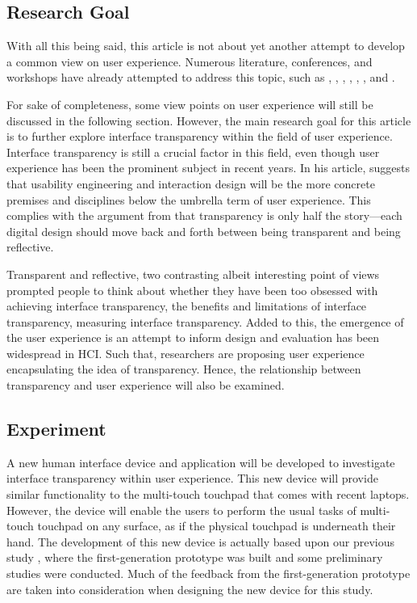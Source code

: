 \documentclass{acm_proc_article-sp}
\begin{document}
\subsection{Research Goal}
With all this being said, this article is not about yet another
attempt to develop a common view on user experience. Numerous
literature, conferences, and workshops have already attempted to
address this topic, such as \citet{early:forlizzi},
\citet{emotional:norman}, \citet{experience:forlizzi},
\citet{action:dourish}, \citet{ux:hassenzahl},
\citet{experience:desmet}, and \citet{ux:law}.

For sake of completeness, some view points on user experience will
still be discussed in the following section. However, the main
research goal for this article is to further explore interface
transparency within the field of user experience. Interface
transparency is still a crucial factor in this field, even though user
experience has been the prominent subject in recent years. In his
article, \citet{future:memmel} suggests that usability engineering and
interaction design will be the more concrete premises and disciplines
below the umbrella term of user experience. This complies with the
argument from \citet{windows:bolter} that transparency is only half
the story---each digital design should move back and forth between
being transparent and being reflective.

Transparent and reflective, two contrasting albeit interesting point
of views prompted people to think about whether they have been too
obsessed with achieving interface transparency, the benefits and
limitations of interface transparency, measuring interface
transparency. Added to this, the emergence of the user experience is
an attempt to inform design and evaluation has been widespread in
HCI. Such that, researchers are proposing user experience
encapsulating the idea of transparency. Hence, the relationship
between transparency and user experience will also be examined.

\subsection{Experiment}
A new human interface device and application will be developed to
investigate interface transparency within user experience. This new
device will provide similar functionality to the multi-touch touchpad
that comes with recent laptops. However, the device will enable the
users to perform the usual tasks of multi-touch touchpad on any
surface, as if the physical touchpad is underneath their hand. The
development of this new device is actually based upon our previous
study \citep{lmnt:huang}, where the first-generation prototype was
built and some preliminary studies were conducted. Much of the
feedback from the first-generation prototype are taken into
consideration when designing the new device for this study.
\end{document}
